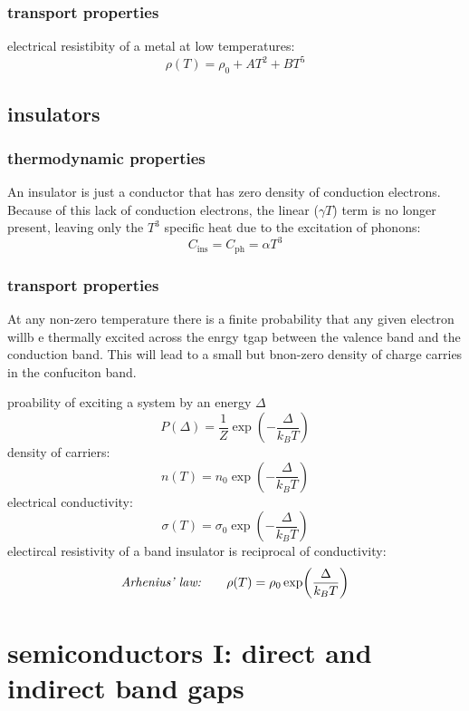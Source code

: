 \documentclass[10pt, a4paper, twocolumn]{article}
\begin{document}
\subsubsection{transport properties}
electrical resistibity of a metal at low temperatures:
\[\rho (T)=\rho _0+AT^2+BT^5\]

\subsection{insulators}
\subsubsection{thermodynamic properties}

An insulator is just a conductor that has zero density of conduction electrons. Because of this lack of conduction electrons, the linear ($\gamma T$) term is no longer present, leaving only the $T^3$ specific heat due to the excitation of phonons:
\[C_\mathrm{ins}=C_\mathrm{ph}=\alpha T^3\]

\subsubsection{transport properties}
At any non-zero temperature there is a finite probability that any given electron willb e thermally excited across the enrgy tgap between the valence band and the conduction band. This will lead to a small but bnon-zero density of charge carries in the confuciton band.

proability of exciting a system by an energy $\Delta$
\[P(\Delta) =\frac1Z\exp(-\frac{\Delta}{k_BT})\]
density of carriers:
\[n(T)=n_0\exp(-\frac{\Delta}{k_BT})\]
electrical conductivity:
\[\sigma(T)=\sigma_0\exp(-\frac{\Delta}{k_BT})\]
electircal resistivity of a band insulator is reciprocal of conductivity:
\[\text{\emph{Arhenius' law:}} \qquad
\rho(T)=\rho_0\exp(\frac{\Delta}{k_BT})\]

\section{semiconductors I: direct and indirect band gaps}
\end{document}
